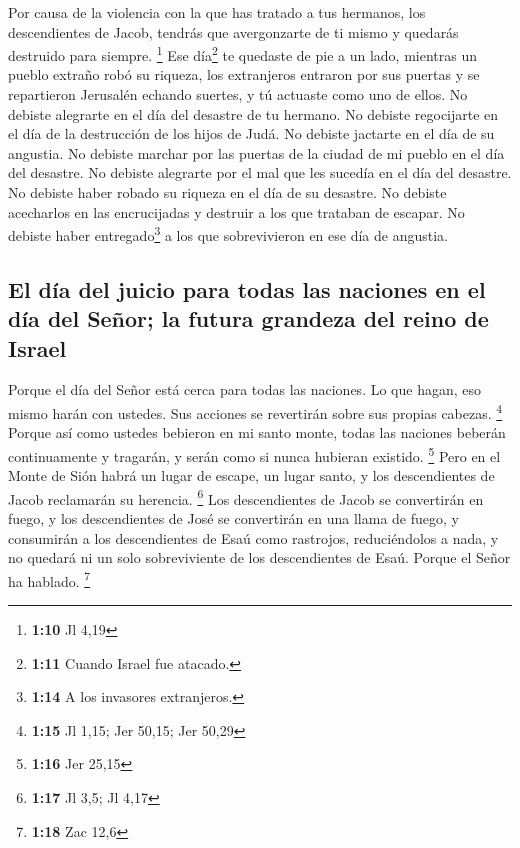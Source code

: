  Por causa de la violencia con la que has tratado a tus
hermanos, los descendientes de Jacob, tendrás que avergonzarte de ti
mismo y quedarás destruido para siempre. \footnote{\textbf{1:10} Jl 4,19}
 Ese día\footnote{\textbf{1:11} Cuando Israel fue
  atacado.} te quedaste de pie a un lado, mientras un pueblo extraño
robó su riqueza, los extranjeros entraron por sus puertas y se
repartieron Jerusalén echando suertes, y tú actuaste como uno de ellos.
 No debiste alegrarte en el día del desastre de tu
hermano. No debiste regocijarte en el día de la destrucción de los hijos
de Judá. No debiste jactarte en el día de su angustia. 
No debiste marchar por las puertas de la ciudad de mi pueblo en el día
del desastre. No debiste alegrarte por el mal que les sucedía en el día
del desastre. No debiste haber robado su riqueza en el día de su
desastre.  No debiste acecharlos en las encrucijadas y
destruir a los que trataban de escapar. No debiste haber
entregado\footnote{\textbf{1:14} A los invasores extranjeros.} a los que
sobrevivieron en ese día de angustia.

\hypertarget{el-duxeda-del-juicio-para-todas-las-naciones-en-el-duxeda-del-seuxf1or-la-futura-grandeza-del-reino-de-israel}{%
\subsection{El día del juicio para todas las naciones en el día del
Señor; la futura grandeza del reino de
Israel}\label{el-duxeda-del-juicio-para-todas-las-naciones-en-el-duxeda-del-seuxf1or-la-futura-grandeza-del-reino-de-israel}}

 Porque el día del Señor está cerca para todas las
naciones. Lo que hagan, eso mismo harán con ustedes. Sus acciones se
revertirán sobre sus propias cabezas. \footnote{\textbf{1:15} Jl 1,15;
  Jer 50,15; Jer 50,29}  Porque así como ustedes bebieron
en mi santo monte, todas las naciones beberán continuamente y tragarán,
y serán como si nunca hubieran existido. \footnote{\textbf{1:16} Jer
  25,15}  Pero en el Monte de Sión habrá un lugar de
escape, un lugar santo, y los descendientes de Jacob reclamarán su
herencia. \footnote{\textbf{1:17} Jl 3,5; Jl 4,17}  Los
descendientes de Jacob se convertirán en fuego, y los descendientes de
José se convertirán en una llama de fuego, y consumirán a los
descendientes de Esaú como rastrojos, reduciéndolos a nada, y no quedará
ni un solo sobreviviente de los descendientes de Esaú. Porque el Señor
ha hablado. \footnote{\textbf{1:18} Zac 12,6}

